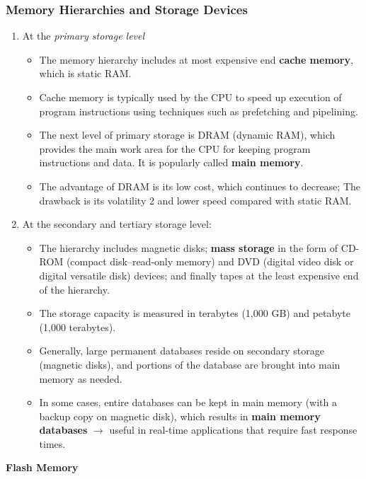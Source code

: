 \documentclass[10pt]{article}
\newcommand{\tf}{\textbf}
\newcommand{\ti}{\textit}
\newcommand{\rarrow}{\rightarrow}
\begin{document}
\subsubsection{Memory Hierarchies and Storage Devices}

\begin{enumerate}
	\item At the \ti{primary storage level}
	
	\begin{itemize}
		\item The memory hierarchy includes at most expensive end \tf{cache memory}, which is static RAM.
		\item  Cache memory is typically used by the CPU to speed up execution of program instructions using techniques such as prefetching and pipelining.
		\item The next level of primary storage is DRAM (dynamic RAM), which provides the main work area for the CPU for keeping program instructions and data. It is popularly called \tf{main memory}.
		\item The advantage of DRAM is its low cost, which continues to decrease; The drawback is its volatility 2 and lower speed compared with static RAM.
	\end{itemize}
	
	\item At the secondary and tertiary storage level:
	
	\begin{itemize}
		\item The hierarchy includes magnetic disks; \tf{mass storage} in the form of CD-ROM (compact disk–read-only memory) and
		DVD (digital video disk or digital versatile disk) devices; and finally tapes at the least expensive end of the hierarchy.
		\item The storage capacity is measured in terabytes (1,000 GB) and petabyte (1,000 terabytes).
		\item Generally, large permanent databases reside on secondary storage (magnetic disks), and portions of the database are brought into main memory as needed. 
		\item In some cases, entire databases can be kept in main memory (with a backup copy on magnetic disk), which results in \tf{main memory databases} $\rarrow$ useful in real-time applications that require fast response times. 
	\end{itemize}
\end{enumerate}

\tf{Flash Memory}
\end{document}
